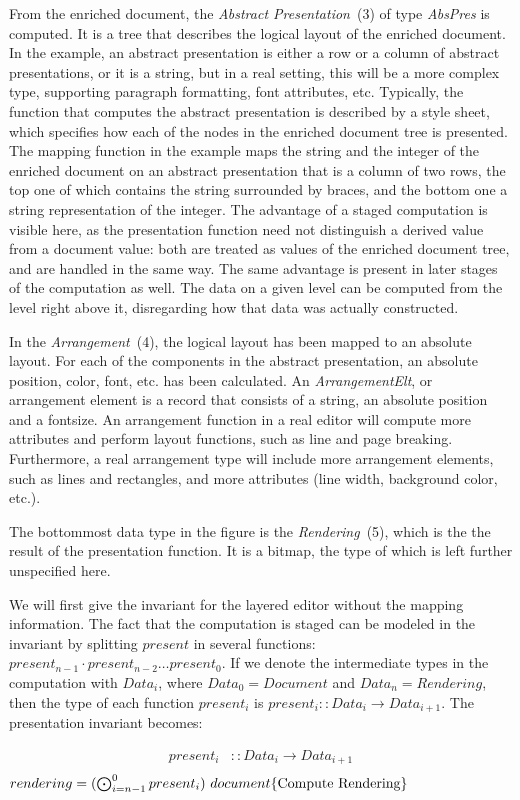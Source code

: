 From the enriched document, the {\em Abstract Presentation}~(3) of type {\em AbsPres} is computed. It is a tree that describes the logical layout of the enriched document. In the example, an abstract presentation is either a row or a column of abstract presentations, or it is a string, but in a real setting, this will be a more complex type, supporting paragraph formatting, font attributes, etc. Typically, the function that computes the abstract presentation is described by a style sheet, which specifies how each of the nodes in the enriched document tree is presented. The mapping function in the example maps the string and the integer of the enriched document on an abstract presentation that is a column of two rows, the top one of which contains the string surrounded by braces, and the bottom one a string representation of the integer. The advantage of a staged computation is visible here, as the presentation function need not distinguish a derived value from a document value: both are treated as values of the enriched document tree, and are handled in the same way. The same advantage is present in later stages of the computation as well. The data on a given level can be computed from the level right above it, disregarding how that data was actually constructed. 

In the {\em Arrangement}~(4), the logical layout has been mapped to an absolute layout. For each of the components in the abstract presentation, an absolute position, color, font, etc. has been calculated. An {\em ArrangementElt}, or arrangement element is a record that consists of a string, an absolute position and a fontsize. An arrangement function in a real editor will compute more attributes and perform layout functions, such as line and page breaking. Furthermore, a real arrangement type will include more arrangement elements, such as lines and rectangles, and more attributes (line width, background color, etc.).

The bottommost data type in the figure is the {\em Rendering}~(5), which is the the result of the presentation function. It is a bitmap, the type of which is left further unspecified here.

We will first give the invariant for the layered editor without the mapping information. The fact that the computation is staged can be modeled in the invariant by splitting $present$ in several functions: $present_{n-1} \cdot present_{n-2} \dots present_{0}$. If we denote the intermediate types in the computation with $Data_i$, where $Data_0 = Document$ and $Data_n = Rendering$, then the type of each function $present_i$ is $present_i :: Data_i \rightarrow Data_{i+1}$. The presentation invariant becomes:\begin{small}\begin{align*} %
present_i & :: Data_i \rightarrow Data_{i+1} \\
\end{align*}
\begin{math}
rendering = (\bigodot_{i=n-1}^{0} present_i)~document
\hfill \text{\{Compute Rendering\}}
\end{math}\end{small}

